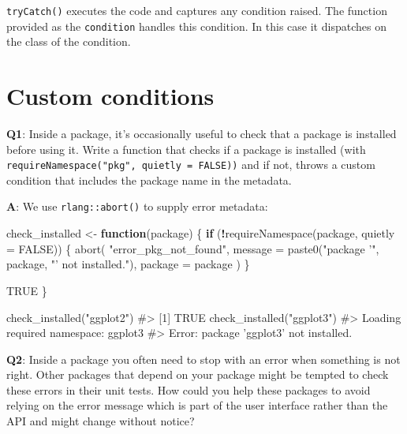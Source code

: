 \documentclass[
]{krantz}
\makeatletter
\newenvironment{Shaded}{\begin{snugshade}}{\end{snugshade}}
\newcommand{\CommentTok}[1]{\textcolor[rgb]{0.56,0.35,0.01}{\textit{#1}}}
\newcommand{\ControlFlowTok}[1]{\textcolor[rgb]{0.13,0.29,0.53}{\textbf{#1}}}
\newcommand{\DataTypeTok}[1]{\textcolor[rgb]{0.13,0.29,0.53}{#1}}
\newcommand{\KeywordTok}[1]{\textcolor[rgb]{0.13,0.29,0.53}{\textbf{#1}}}
\newcommand{\NormalTok}[1]{#1}
\newcommand{\OperatorTok}[1]{\textcolor[rgb]{0.81,0.36,0.00}{\textbf{#1}}}
\newcommand{\OtherTok}[1]{\textcolor[rgb]{0.56,0.35,0.01}{#1}}
\newcommand{\StringTok}[1]{\textcolor[rgb]{0.31,0.60,0.02}{#1}}
\newenvironment{kframe}{%
\medskip{}
\setlength{\fboxsep}{.8em}
 \def\at@end@of@kframe{}%
 \ifinner\ifhmode%
  \def\at@end@of@kframe{\end{minipage}}%
  \begin{minipage}{\columnwidth}%
 \fi\fi%
 \def\FrameCommand##1{\hskip\@totalleftmargin \hskip-\fboxsep
 \colorbox{shadecolor}{##1}\hskip-\fboxsep
     \hskip-\linewidth \hskip-\@totalleftmargin \hskip\columnwidth}%
 \MakeFramed {\advance\hsize-\width
   \@totalleftmargin\z@ \linewidth\hsize
   \@setminipage}}%
 {\par\unskip\endMakeFramed%
 \at@end@of@kframe}
\renewenvironment{Shaded}{\begin{kframe}}{\end{kframe}}
\renewcommand{\KeywordTok} [1]{\textcolor[rgb]{0.00,0.44,0.13}{{#1}}}
\renewcommand{\DataTypeTok}[1]{\textcolor[rgb]{0.56,0.13,0.00}{{#1}}}
\renewcommand{\StringTok}  [1]{\textcolor[rgb]{0.25,0.44,0.63}{{#1}}}
\renewcommand{\CommentTok} [1]{\textcolor[rgb]{0.38,0.63,0.69}{{#1}}}
\renewcommand{\OtherTok}   [1]{\textcolor[rgb]{0.00,0.44,0.13}{{#1}}}
\renewcommand{\NormalTok}  [1]{{#1}}
\makeatother
\begin{document}
\texttt{tryCatch()} executes the code and captures any condition raised. The function provided as the \texttt{condition} handles this condition. In this case it dispatches on the class of the condition.

\hypertarget{custom-conditions}{%
\section{Custom conditions}\label{custom-conditions}}

\textbf{{Q1}}: Inside a package, it's occasionally useful to check that a package is installed before using it. Write a function that checks if a package is installed (with \texttt{requireNamespace("pkg",\ quietly\ =\ FALSE))} and if not, throws a custom condition that includes the package name in the metadata.

\textbf{{A}}: We use \texttt{rlang::abort()} to supply error metadata:

\begin{Shaded}
\begin{Highlighting}[]
\NormalTok{check_installed <-}\StringTok{ }\ControlFlowTok{function}\NormalTok{(package)  \{}
  \ControlFlowTok{if}\NormalTok{ (}\OperatorTok{!}\KeywordTok{requireNamespace}\NormalTok{(package, }\DataTypeTok{quietly =} \OtherTok{FALSE}\NormalTok{)) \{}
    \KeywordTok{abort}\NormalTok{(}
      \StringTok{"error_pkg_not_found"}\NormalTok{,}
      \DataTypeTok{message =} \KeywordTok{paste0}\NormalTok{(}\StringTok{"package '"}\NormalTok{, package, }\StringTok{"' not installed."}\NormalTok{),}
      \DataTypeTok{package =}\NormalTok{ package}
\NormalTok{    )}
\NormalTok{  \}}
  
  \OtherTok{TRUE}
\NormalTok{\}}

\KeywordTok{check_installed}\NormalTok{(}\StringTok{"ggplot2"}\NormalTok{)}
\CommentTok{#> [1] TRUE}
\KeywordTok{check_installed}\NormalTok{(}\StringTok{"ggplot3"}\NormalTok{)}
\CommentTok{#> Loading required namespace: ggplot3}
\CommentTok{#> Error: package 'ggplot3' not installed.}
\end{Highlighting}
\end{Shaded}

\textbf{{Q2}}: Inside a package you often need to stop with an error when something is not right. Other packages that depend on your package might be tempted to check these errors in their unit tests. How could you help these packages to avoid relying on the error message which is part of the user interface rather than the API and might change without notice?
\end{document}

